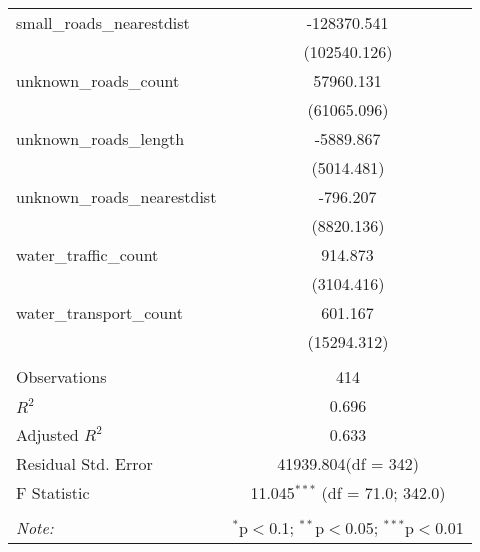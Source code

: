 \begin{table}[!htbp]
\begin{tabular}{@{\extracolsep{5pt}}lc}
 small_roads_nearestdist & -128370.541$^{}$ \\
  & (102540.126) \\
 unknown_roads_count & 57960.131$^{}$ \\
  & (61065.096) \\
 unknown_roads_length & -5889.867$^{}$ \\
  & (5014.481) \\
 unknown_roads_nearestdist & -796.207$^{}$ \\
  & (8820.136) \\
 water_traffic_count & 914.873$^{}$ \\
  & (3104.416) \\
 water_transport_count & 601.167$^{}$ \\
  & (15294.312) \\
\hline \\[-1.8ex]
 Observations & 414 \\
 $R^2$ & 0.696 \\
 Adjusted $R^2$ & 0.633 \\
 Residual Std. Error & 41939.804(df = 342)  \\
 F Statistic & 11.045$^{***}$ (df = 71.0; 342.0) \\
\hline
\hline \\[-1.8ex]
\textit{Note:} & \multicolumn{1}{r}{$^{*}$p$<$0.1; $^{**}$p$<$0.05; $^{***}$p$<$0.01} \\
\end{tabular}
\end{table}